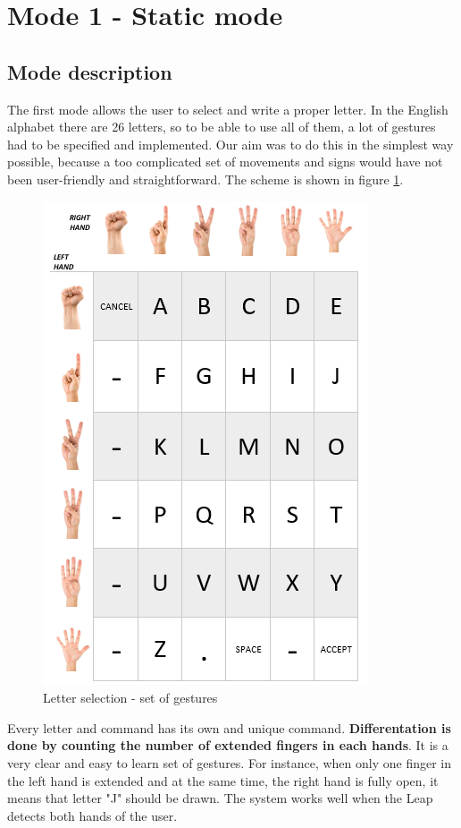 \section{Mode 1 - Static mode}
\subsection {Mode description}
The first mode allows the user to select and write a proper letter. In the English alphabet there are 26 letters, so to be able to use all of them, a lot of gestures had to be specified and implemented. Our aim was to do this in the simplest way possible, because a too complicated set of movements and signs would have not been user-friendly and straightforward. The scheme is shown in figure \ref{fig:letters}.

\begin{figure}[H]
	\includegraphics{static_gestures}
	\centering
	\caption{Letter selection - set of gestures}
	\label{fig:letters}
\end{figure}

Every letter and command has its own and unique command. \textbf{Differentation is done by counting the number of extended fingers in each hands}. It is a very clear and easy to learn set of gestures. For instance, when only one finger in the left hand is extended and at the same time, the right hand is fully open, it means that letter "J" should be drawn. The system works well when the Leap detects both hands of the user.\\

